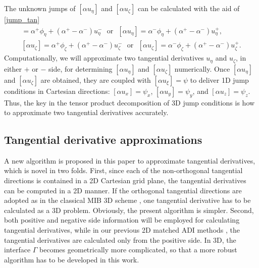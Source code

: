 \documentclass[dissertation]{uathesis}
\begin{document}
\begin{body}
The unknown jumps of $[\alpha u_{\eta}]$ and $[\alpha u_{\zeta}]$ can be calculated with the aid of \eqref{jump_tan}
\begin{align}
[\alpha u_{\eta}] = \alpha^{+}\phi_{\eta} + (\alpha^{+}-\alpha^{-})u^{-}_{\eta} ~~~ \mbox{or} ~~~ [\alpha u_{\eta}]  = \alpha^{-}\phi_{\eta} + (\alpha^{+}-\alpha^{-}) u^{+}_{\eta}, \label{alpha u_eta}    \\
[\alpha u_{\zeta}] = \alpha^{+}\phi_{\zeta} + (\alpha^{+}-\alpha^{-}) u^{-}_{\zeta} ~~~ \mbox{or} ~~~ [\alpha u_{\zeta}] = \alpha^{-}\phi_{\zeta} + (\alpha^{+}-\alpha^{-}) u^{+}_{\zeta}. \label{alpha u_zeta}
\end{align}
Computationally, we will approximate two tangential derivatives $u_{\eta}$ and $u_{\zeta}$, in either $+$ or $-$ side, for determining $[\alpha u_{\eta}]$ and $[\alpha u_{\zeta}]$ numerically. 
Once $[\alpha u_{\eta}]$ and $[\alpha u_{\zeta}]$ are obtained, they are coupled with  $[\alpha u_{\xi}] = \psi$ to deliver 1D jump conditions in Cartesian directions: 
$ [\alpha u_x]=\psi_x$, $ [\alpha u_y]=\psi_y$, and $ [\alpha u_z]=\psi_z$. 
Thus, the key in the tensor product decomposition of 3D jump conditions is how to approximate two tangential derivatives accurately. 

\subsection{Tangential derivative approximations}
A new algorithm is proposed in this paper to approximate tangential derivatives, which is novel in two folds. 
First, since each of the non-orthogonal tangential directions is contained in a 2D Cartesian grid plane, the tangential derivatives can be computed in a 2D manner. If the orthogonal tangential directions are adopted as in the classical MIB 3D scheme \cite{yu2007three}, one tangential derivative has to be calculated as a 3D problem. Obviously, the present algorithm is  simpler. 
Second, both positive and negative side information will be employed for calculating tangential derivatives, while in our previous 2D matched ADI methods  \cite{zhao2015matched,li2017matched}, the tangential derivatives are calculated only from the positive side. 
In 3D, the interface $\Gamma$ becomes geometrically more complicated, so that a more robust algorithm has to be developed in this work. 



\end{body}
\end{document}
